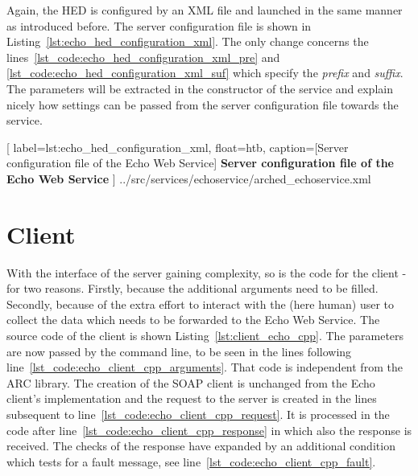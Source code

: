 Again, the HED is configured by an XML file and launched in the same manner as introduced before.
The server configuration file is shown in Listing~\ref{lst:echo_hed_configuration_xml}.
The only change concerns the lines~\ref{lst_code:echo_hed_configuration_xml_pre} and \ref{lst_code:echo_hed_configuration_xml_suf} which specify the \textit{prefix} and \textit{suffix}.
The parameters will be extracted in the constructor of the service and explain nicely how settings can be passed from the server configuration file towards the service.


	[
	label=lst:echo_hed_configuration_xml, float=htb,
	caption={[Server configuration file of the Echo Web Service]
	\textbf{Server configuration file of the Echo Web Service}}
	]
{../src/services/echoservice/arched_echoservice.xml}








\section{Client}

With the interface of the server gaining complexity, so is the code for the client - for two reasons. Firstly, because the additional arguments need to be filled. Secondly, because of the extra effort to interact with the (here human) user to collect the data which needs to be forwarded to the Echo Web Service. The source code of the client is shown Listing~\ref{lst:client_echo_cpp}.
The parameters are now passed by the command line, to be seen in the lines following line~\ref{lst_code:echo_client_cpp_arguments}.
That code is independent from the ARC library.
The creation of the SOAP client is unchanged from the Echo client's implementation and the request to the server is created in the lines subsequent to line~\ref{lst_code:echo_client_cpp_request}.
It is processed in the code after line~\ref{lst_code:echo_client_cpp_response} in which also the response is received.
The checks of the response have expanded by an additional condition which tests for a fault message, see line~\ref{lst_code:echo_client_cpp_fault}.


